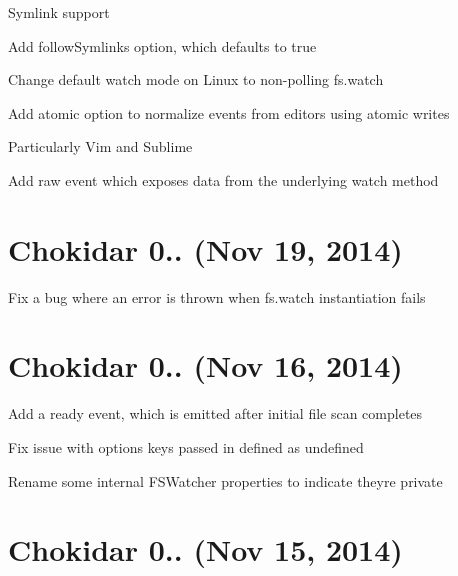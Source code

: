 \begin{DoxyItemize}
\item Symlink support
\begin{DoxyItemize}
\item Add {\ttfamily follow\+Symlinks} option, which defaults to {\ttfamily true}
\end{DoxyItemize}
\item Change default watch mode on Linux to non-\/polling {\ttfamily fs.\+watch}
\item Add {\ttfamily atomic} option to normalize events from editors using atomic writes
\begin{DoxyItemize}
\item Particularly Vim and Sublime
\end{DoxyItemize}
\item Add {\ttfamily raw} event which exposes data from the underlying watch method
\end{DoxyItemize}

\section*{Chokidar 0.. (Nov 19, 2014)}


\begin{DoxyItemize}
\item Fix a bug where an error is thrown when {\ttfamily fs.\+watch} instantiation fails
\end{DoxyItemize}

\section*{Chokidar 0.. (Nov 16, 2014)}


\begin{DoxyItemize}
\item Add a {\ttfamily ready} event, which is emitted after initial file scan completes
\item Fix issue with options keys passed in defined as {\ttfamily undefined}
\item Rename some internal {\ttfamily F\+S\+Watcher} properties to indicate they\textquotesingle{}re private
\end{DoxyItemize}

\section*{Chokidar 0.. (Nov 15, 2014)}


